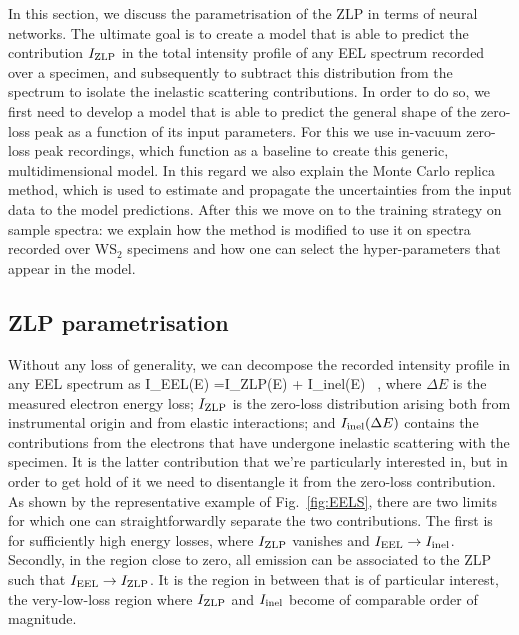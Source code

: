 In this section, we discuss the parametrisation of the ZLP in terms of neural networks.
%
The ultimate goal is to create a model that is able to predict the contribution $I_{\rm ZLP}$
in the total intensity profile of any EEL spectrum recorded over a specimen, 
and subsequently to subtract this distribution from the spectrum to isolate the inelastic
scattering contributions.
%
In order to do so, we first need to develop a model that is able to predict the general
shape of the zero-loss peak as a function of its input parameters. 
%
For this we use in-vacuum zero-loss peak recordings, which function as a baseline to 
create this generic, multidimensional model.
%
In this regard we also
explain the Monte Carlo replica method, which is used to estimate and propagate the
uncertainties from the input data to the model predictions.
%
After this we move on to the training strategy on sample spectra: 
we explain how the method is modified to use it on spectra recorded over
WS$_2$ specimens and how one can select the hyper-parameters that appear in the model.


\subsection{ZLP parametrisation}
\label{sec:parametrisation}

Without any loss of generality, we can decompose the recorded intensity profile
in any EEL spectrum as
\be
\label{eq:IeelTot}
I_{\rm EEL}(\Delta E) =I_{\rm ZLP}(\Delta E) + I_{\rm inel}(\Delta E) \, ,
\ee
where $\Delta E$ is the measured electron energy loss; $I_{\rm ZLP}$ is the zero-loss
distribution arising both from instrumental origin and from elastic interactions; and
$I_{\rm inel}(\Delta E)$ contains the contributions from the electrons that have undergone
inelastic scattering with the specimen. 
%
It is the latter contribution that we're particularly interested in, but in order 
to get hold of it we need to disentangle it from the zero-loss contribution.
%
As shown by the representative example of Fig.~\ref{fig:EELS}, there are two limits
for which one can straightforwardly separate the two contributions.
%
The first is for sufficiently high energy losses, where
$I_{\rm ZLP}$ vanishes and $I_{\rm EEL} \to I_{\rm inel}$.
%
Secondly, in the region close to zero, all emission can be associated to
the ZLP such that $I_{\rm EEL}\to  I_{\rm ZLP}$.
%
It is the region in between that is of particular interest, 
the very-low-loss region where $I_{\rm ZLP}$ and $I_{\rm inel}$
become of comparable order of magnitude.

